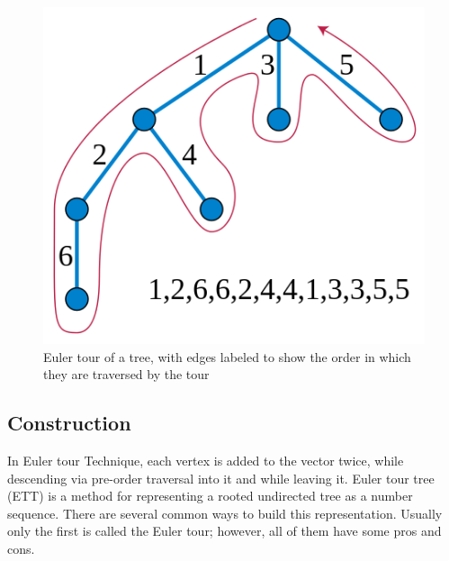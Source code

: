 \documentclass[12pt]{article}
\begin{document}
\begin{figure}[H]
  \centering
  \includegraphics[width=\linewidth/4]{Stirling.png}
  \caption{Euler tour of a tree, with edges labeled to show the order in which they are traversed by the tour \cite{3} }
\end{figure}

\subsection{Construction}

In Euler tour Technique, each vertex is added to the vector twice, while descending via pre-order traversal  into it and while leaving it.
Euler tour tree (ETT) is a method for representing a rooted undirected tree as a number sequence. There are several common ways to build this representation. Usually only the first is called the Euler tour; however, all of them have some pros and cons. 
\end{document}
